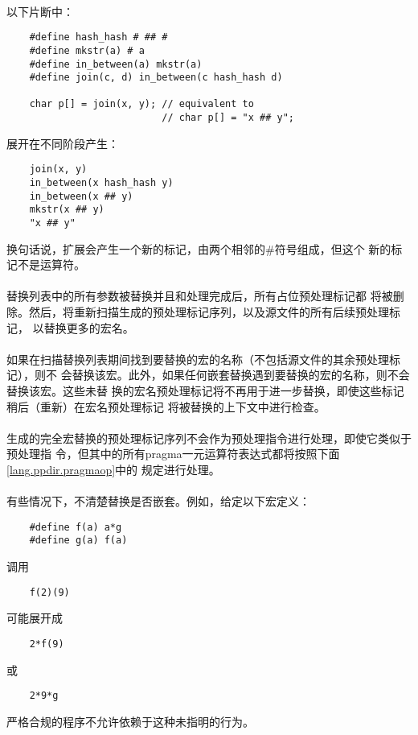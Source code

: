 \paragraph{}
\ex* 以下片断中：
\begin{lstlisting}
    #define hash_hash # ## #
    #define mkstr(a) # a
    #define in_between(a) mkstr(a)
    #define join(c, d) in_between(c hash_hash d)

    char p[] = join(x, y); // equivalent to
                           // char p[] = "x ## y";
\end{lstlisting}
展开在不同阶段产生：
\begin{lstlisting}
    join(x, y)
    in_between(x hash_hash y)
    in_between(x ## y)
    mkstr(x ## y)
    "x ## y"
\end{lstlisting}
换句话说，扩展会产生一个新的标记，由两个相邻的\#符号组成，但这个
新的标记不是运算符。

\paragraph{}
替换列表中的所有参数被替换并且\tm{\#}和\tm{\#\#}处理完成后，所有占位预处理标记都
将被删除。然后，将重新扫描生成的预处理标记序列，以及源文件的所有后续预处理标记，
以替换更多的宏名。

\paragraph{}
如果在扫描替换列表期间找到要替换的宏的名称（不包括源文件的其余预处理标记），则不
会替换该宏。此外，如果任何嵌套替换遇到要替换的宏的名称，则不会替换该宏。这些未替
换的宏名预处理标记将不再用于进一步替换，即使这些标记稍后（重新）在宏名预处理标记
将被替换的上下文中进行检查。

\paragraph{}
生成的完全宏替换的预处理标记序列不会作为预处理指令进行处理，即使它类似于预处理指
令，但其中的所有pragma一元运算符表达式都将按照下面\ref{lang.ppdir.pragmaop}中的
规定进行处理。

\paragraph{}
\ex* 有些情况下，不清楚替换是否嵌套。例如，给定以下宏定义：
\begin{lstlisting}
    #define f(a) a*g
    #define g(a) f(a)
\end{lstlisting}
调用
\begin{lstlisting}
    f(2)(9)
\end{lstlisting}
可能展开成
\begin{lstlisting}
    2*f(9)
\end{lstlisting}
或
\begin{lstlisting}
    2*9*g
\end{lstlisting}
严格合规的程序不允许依赖于这种未指明的行为。

